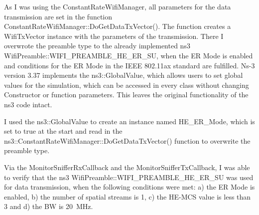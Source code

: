As I was using the ConstantRateWifiManager, all parameters for the data transmission are set in the function
ConstantRateWifiManager::DoGetDataTxVector().
The function creates a WifiTxVector instance with the parameters of the
transmission.
There I overwrote the preamble type to the already implemented ns3 WifiPreamble::WIFI\_PREAMBLE\_HE\_ER\_SU, when
the \ac{ER} Mode is enabled and conditions for the \ac{ER} Mode in the IEEE 802.11ax standard \cite{ieee_standard_2021ax} are fulfilled.
Ns-3 version 3.37 implements the ns3::GlobalValue, which allows users to set global values for the simulation, which can be accessed
in every class without changing Constructor or function parameters.
This leaves the original functionality of the ns3 code intact.

I used the ns3::GlobalValue to create an instance named HE\_ER\_Mode, which is set to true at the start and read in the ns3::ConstantRateWifiManager::Do\-Get\-Data\-Tx\-Vector() function
to overwrite the preamble type.

Via the MonitorSnifferRxCallback and the MonitorSnifferTxCallback, I was able to verify that the ns3 WifiPreamble::WIFI\_PREAMBLE\_HE\_ER\_SU was used
for data transmission, when the following conditions were met: a) the \ac{ER} Mode is enabled, b) the number of spatial streams is \num{1}, c) the \ac{HE}-\ac{MCS} value is less than \num{3} and
d) the \ac{BW} is \SI{20}{\mega\hertz}.

